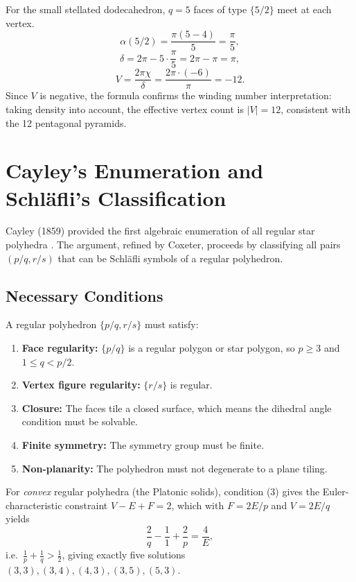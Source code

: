 \begin{proposition}
For the small stellated dodecahedron, $q=5$ faces of type
$\{5/2\}$ meet at each vertex.
\[
  \alpha(5/2) = \frac{\pi(5-4)}{5} = \frac{\pi}{5},
\]
\[
  \delta = 2\pi - 5 \cdot \frac{\pi}{5} = 2\pi - \pi = \pi,
\]
\[
  V = \frac{2\pi\chi}{\delta} = \frac{2\pi\cdot(-6)}{\pi} = -12.
\]
Since $V$ is negative, the formula confirms the winding number
interpretation: taking density into account, the effective
vertex count is $|V| = 12$, consistent with the 12 pentagonal
pyramids.
\end{proposition}

\section{Cayley's Enumeration and Schl\"{a}fli's Classification}
\label{sec:cayley-enumeration}

Cayley (1859) provided the first algebraic enumeration of all
regular star polyhedra \cite{coxeter_regular_polytopes}.  The argument,
refined by Coxeter, proceeds by classifying all pairs
$(p/q, r/s)$ that can be Schläfli symbols of a regular
polyhedron.

\subsection{Necessary Conditions}
\label{ssec:necessary-conditions}

A regular polyhedron \(\{p/q, r/s\}\) must satisfy:
\begin{enumerate}
  \item \textbf{Face regularity:} $\{p/q\}$ is a regular polygon or star polygon, so $p \geq 3$ and $1 \leq q < p/2$.
  \item \textbf{Vertex figure regularity:} $\{r/s\}$ is regular.
  \item \textbf{Closure:} The faces tile a closed surface, which means the dihedral angle condition must be solvable.
  \item \textbf{Finite symmetry:} The symmetry group must be finite.
  \item \textbf{Non-planarity:} The polyhedron must not degenerate to a plane tiling.
\end{enumerate}

For \emph{convex} regular polyhedra (the Platonic solids),
condition (3) gives the Euler-characteristic constraint
\(V - E + F = 2\), which with $F = 2E/p$ and $V = 2E/q$
yields
\[
  \frac{2}{q} - \frac{1}{1} + \frac{2}{p} = \frac{4}{E},
\]
i.e.\ $\frac{1}{p} + \frac{1}{q} > \frac{1}{2}$, giving
exactly five solutions $(3,3),(3,4),(4,3),(3,5),(5,3)$.

